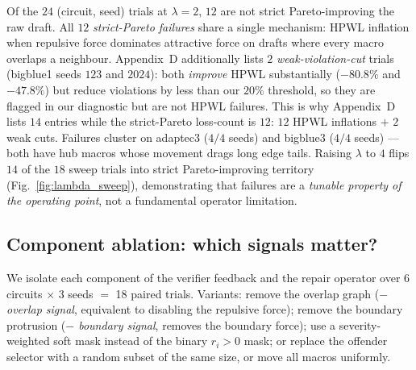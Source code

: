 \documentclass{article}
\begin{document}
Of the $24$ (circuit, seed) trials at $\lambda=2$, $12$ are not strict
Pareto-improving the raw draft.  All $12$ \emph{strict-Pareto failures}
share a single mechanism: HPWL inflation when repulsive force dominates
attractive force on drafts where every macro overlaps a neighbour.
Appendix~D additionally lists $2$ \emph{weak-violation-cut} trials
(bigblue1 seeds $123$ and $2024$): both \emph{improve} HPWL substantially
($-80.8\%$ and $-47.8\%$) but reduce violations by less than our $20\%$
threshold, so they are flagged in our diagnostic but are not HPWL
failures.  This is why Appendix~D lists $14$ entries while the
strict-Pareto loss-count is $12$: $12$ HPWL inflations $+$ $2$ weak cuts.
Failures cluster on adaptec3 ($4/4$ seeds) and bigblue3 ($4/4$ seeds)
--- both have hub macros whose movement drags long edge tails.  Raising
$\lambda$ to $4$ flips $14$ of the $18$ sweep trials into strict
Pareto-improving territory (Fig.~\ref{fig:lambda_sweep}), demonstrating
that failures are a \emph{tunable property of the operating point}, not
a fundamental operator limitation.

\subsection{Component ablation: which signals matter?}
\label{sec:component_ablation}

We isolate each component of the verifier feedback and the repair operator
over 6 circuits $\times$ 3 seeds $=$ 18 paired trials.  Variants:
remove the overlap graph (\textit{$-$ overlap signal}, equivalent to disabling
the repulsive force); remove the boundary protrusion (\textit{$-$ boundary
signal}, removes the boundary force); use a severity-weighted soft mask
instead of the binary $r_i{>}0$ mask; or replace the offender selector with a
random subset of the same size, or move all macros uniformly.

\begin{table}[h]
\centering
\scriptsize

\caption{Component ablation, mean $\pm$ std over 18 (circuit, seed) pairs.
Removing the pairwise overlap signal (and equivalently the repulsive force)
\emph{inflates} violations by 79\%; removing the attractive force preserves
violation reduction but inflates HPWL by 138\%; soft (severity-weighted)
masking degrades both metrics by 28\,pp on $\Delta v$.  Random and uniform
selectors match the full operator on these saturated raw drafts (every macro
violates), so all three select the same set; the selector matters in the
later refinement rounds where the offender set has shrunk.  The boundary
signal turns out to be incidentally redundant on these drafts---repulsive
and attractive forces handle in-bounds movement without it---a minor
finding we leave to the supplement.}
\label{tab:component_ablation}
\end{table}
\end{document}
